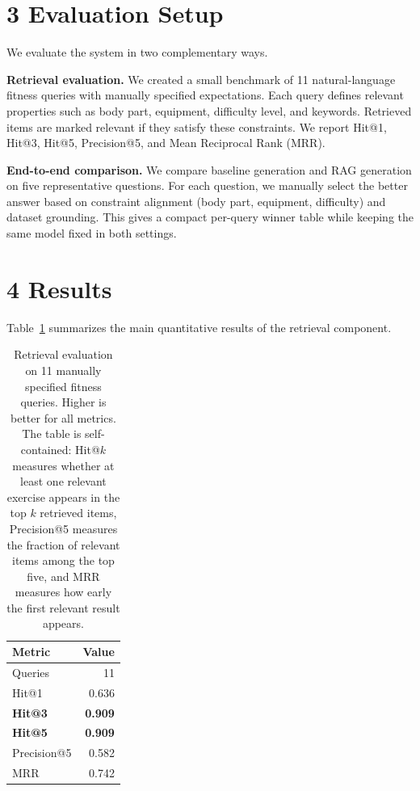 \documentclass[fleqn,moreauthors,10pt]{ds_report}
\begin{document}
\section*{3 Evaluation Setup}

We evaluate the system in two complementary ways.

\textbf{Retrieval evaluation.} We created a small benchmark of 11 natural-language fitness queries with manually specified expectations. Each query defines relevant properties such as body part, equipment, difficulty level, and keywords. Retrieved items are marked relevant if they satisfy these constraints. We report Hit@1, Hit@3, Hit@5, Precision@5, and Mean Reciprocal Rank (MRR).

\textbf{End-to-end comparison.} We compare baseline generation and RAG generation on five representative questions. For each question, we manually select the better answer based on constraint alignment (body part, equipment, difficulty) and dataset grounding. This gives a compact per-query winner table while keeping the same model fixed in both settings.

\section*{4 Results}

Table~\ref{tab:main-results} summarizes the main quantitative results of the retrieval component.

\begin{table}[h]
\centering
\caption{Retrieval evaluation on 11 manually specified fitness queries. Higher is better for all metrics. The table is self-contained: Hit@$k$ measures whether at least one relevant exercise appears in the top $k$ retrieved items, Precision@5 measures the fraction of relevant items among the top five, and MRR measures how early the first relevant result appears.}
\label{tab:main-results}
\begin{tabular}{lr}
\toprule
Metric & Value \\
\midrule
Queries & 11 \\
Hit@1 & 0.636 \\
\textbf{Hit@3} & \textbf{0.909} \\
\textbf{Hit@5} & \textbf{0.909} \\
Precision@5 & 0.582 \\
MRR & 0.742 \\
\bottomrule
\end{tabular}
\end{table}
\end{document}
